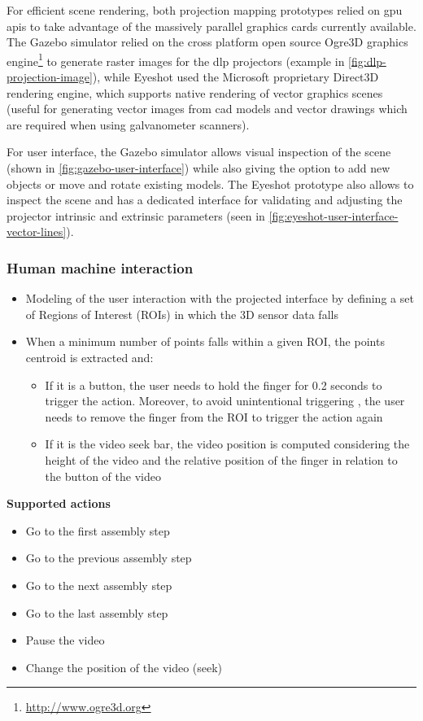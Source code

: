 For efficient scene rendering, both projection mapping prototypes relied on \gls{gpu} \glspl{api} to take advantage of the massively parallel graphics cards currently available. The Gazebo simulator relied on the cross platform open source Ogre3D graphics engine\footnote{\url{http://www.ogre3d.org}} to generate raster images for the \gls{dlp} projectors (example in \cref{fig:dlp-projection-image}), while Eyeshot used the Microsoft proprietary Direct3D rendering engine, which supports native rendering of vector graphics scenes (useful for generating vector images from \gls{cad} models and vector drawings which are required when using galvanometer scanners).

For user interface, the Gazebo simulator allows visual inspection of the scene (shown in \cref{fig:gazebo-user-interface}) while also giving the option to add new objects or move and rotate existing models. The Eyeshot prototype also allows to inspect the scene and has a dedicated interface for validating and adjusting the projector intrinsic and extrinsic parameters (seen in \cref{fig:eyeshot-user-interface-vector-lines}).


\subsubsection{Human machine interaction}

\begin{itemize}
	\item Modeling of the user interaction with the projected interface by defining a set of Regions of Interest (ROIs) in which the 3D sensor data falls
	\item When a minimum number of points falls within a given ROI, the points centroid is extracted and:
	\begin{itemize}
		\item If it is a button, the user needs to hold the finger for 0.2 seconds to trigger the action. Moreover, to avoid unintentional triggering , the user needs to remove the finger from the ROI to trigger the action again
		\item If it is the video seek bar, the video position is computed considering the height of the video and the relative position of the finger in relation to the button of the video
	\end{itemize}
\end{itemize}

\textbf{Supported actions}
\begin{itemize}
	\item Go to the first assembly step
	\item Go to the previous assembly step
	\item Go to the next assembly step
	\item Go to the last assembly step
	\item Pause the video
	\item Change the position of the video (seek)
\end{itemize}

